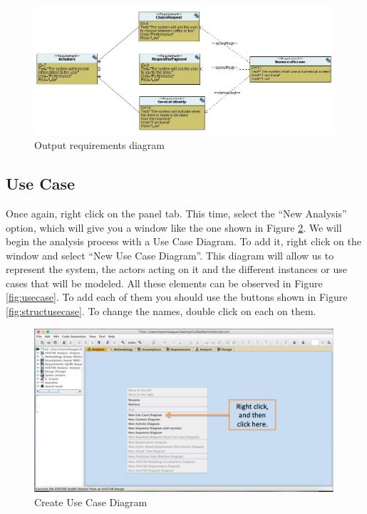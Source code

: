 \documentclass[12pt]{article}
\begin{document}
\begin{figure}[htbp]
\centering
\includegraphics[width=0.99\textwidth]{fig/outputreq.jpg}
\caption{Output requirements diagram} \label{fig:outputreq}
\end{figure}

\subsection{Use Case}
	Once again, right click on the panel tab. This time, select the “New Analysis” option, which will give you a window like the one shown in Figure \ref{fig:createusecase}. We will begin the analysis process with a Use Case Diagram. To add it, right click on the window and select “New Use Case Diagram”. This diagram will allow us to represent the system, the actors acting on it and the different instances or use cases that will be modeled. All these elements can be observed in Figure \ref{fig:usecase}. To add each of them you should use the buttons shown in Figure \ref{fig:structusecase}. To change the names, double click on each on them.
	
\begin{figure}[htbp]
\centering
\includegraphics[width=0.99\textwidth]{fig/createusecase.png}
\caption{Create Use Case Diagram} \label{fig:createusecase}
\end{figure}
\end{document}
